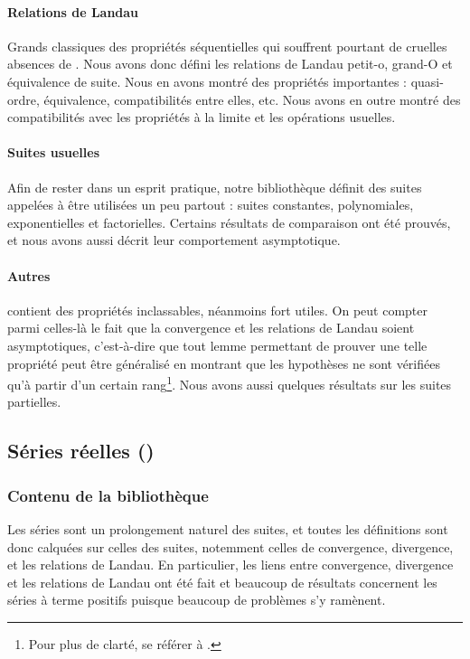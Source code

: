 \paragraph{Relations de Landau} Grands classiques des propriétés séquentielles qui souffrent pourtant de cruelles absences de . Nous avons donc défini les relations de Landau petit-o, grand-O et équivalence de suite. Nous en avons montré des propriétés importantes : quasi-ordre, équivalence, compatibilités entre elles, etc. Nous avons en outre montré des compatibilités avec les propriétés à la limite et les opérations usuelles.

\paragraph{Suites usuelles} Afin de rester dans un esprit pratique, notre bibliothèque définit des suites appelées à être utilisées un peu partout : suites constantes, polynomiales, exponentielles et factorielles. Certains résultats de comparaison ont été prouvés, et nous avons aussi décrit leur comportement asymptotique.

\paragraph{Autres}  contient des propriétés inclassables, néanmoins fort utiles. On peut compter parmi celles-là le fait que la convergence et les relations de Landau soient asymptotiques, c'est-à-dire que tout lemme permettant de prouver une telle propriété peut être généralisé en montrant que les hypothèses ne sont vérifiées qu'à partir d'un certain rang\footnote{Pour plus de clarté, se référer à .}. Nous avons aussi quelques résultats sur les suites partielles.

\subsection{Séries réelles ()}

\subsubsection{Contenu de la bibliothèque}

Les séries sont un prolongement naturel des suites, et toutes les définitions sont donc calquées sur celles des suites, notemment celles de convergence, divergence, et les relations de Landau.
En particulier, les liens entre convergence, divergence et les relations de Landau ont été fait et beaucoup de résultats concernent les séries à terme positifs puisque beaucoup de problèmes s'y ramènent.

